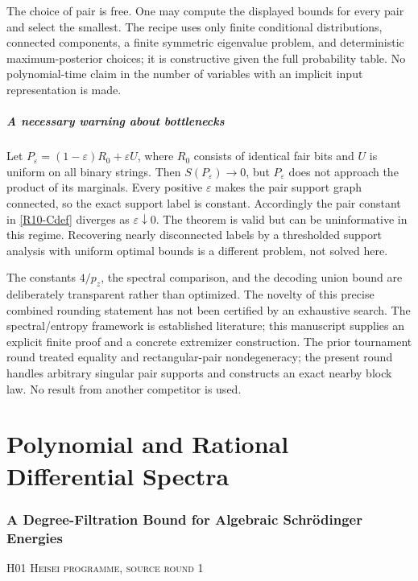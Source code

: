 \documentclass[11pt,a4paper]{article}
\theoremstyle{definition}\newtheorem{definition}[theorem]{Definition}
\theoremstyle{remark}\newtheorem{remark}[theorem]{Remark}
\numberwithin{equation}{section}
\begin{document}
The choice of pair is free. One may compute the displayed bounds for every pair and select the smallest. The recipe uses only finite conditional distributions, connected components, a finite symmetric eigenvalue problem, and deterministic maximum-posterior choices; it is constructive given the full probability table. No polynomial-time claim in the number of variables with an implicit input representation is made.

\subsubsection{A necessary warning about bottlenecks}
Let $P_\varepsilon=(1-\varepsilon)R_0+\varepsilon U$, where $R_0$ consists of identical fair bits and $U$ is uniform on all binary strings. Then $S(P_\varepsilon)\to0$, but $P_\varepsilon$ does not approach the product of its marginals. Every positive $\varepsilon$ makes the pair support graph connected, so the exact support label is constant. Accordingly the pair constant in \eqref{R10-Cdef} diverges as $\varepsilon\downarrow0$. The theorem is valid but can be uninformative in this regime. Recovering nearly disconnected labels by a thresholded support analysis with uniform optimal bounds is a different problem, not solved here.

The constants $4/p_z$, the spectral comparison, and the decoding union bound are deliberately transparent rather than optimized. The novelty of this precise combined rounding statement has not been certified by an exhaustive search. The spectral/entropy framework is established literature; this manuscript supplies an explicit finite proof and a concrete extremizer construction. The prior tournament round treated equality and rectangular-pair nondegeneracy; the present round handles arbitrary singular pair supports and constructs an exact nearby block law. No result from another competitor is used.





\clearpage
\part{Polynomial and Rational Differential Spectra}


\clearpage
\section[H01 --- A Degree-Filtration Bound for Algebraic Schr\"odinger Energies]{A Degree-Filtration Bound for Algebraic Schr\"odinger Energies}\label{contrib-H01}
\noindent\textsc{H01 \quad Heisei programme, source round 1}\par\medskip
\end{document}
